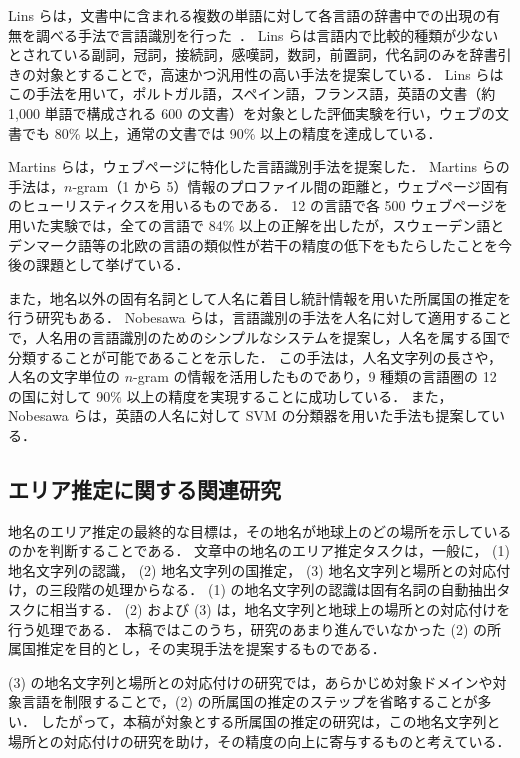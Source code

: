 \documentclass[japanese]{jnlp_1.4}
\begin{document}
Lins らは，文書中に含まれる複数の単語に対して各言語の辞書中での出現の有無を調べる手法で言語識別を行った~\cite{Lins04}．
Lins らは言語内で比較的種類が少ないとされている副詞，冠詞，接続詞，感嘆詞，数詞，前置詞，代名詞のみを辞書引きの対象とすることで，高速かつ汎用性の高い手法を提案している．
Lins らはこの手法を用いて，ポルトガル語，スペイン語，フランス語，英語の文書（約 1,000 単語で構成される 600 の文書）を対象とした評価実験を行い，ウェブの文書でも 80\% 以上，通常の文書では 90\% 以上の精度を達成している．

Martins らは，ウェブページに特化した言語識別手法を提案した\cite{Martins05}．
Martins らの手法は，$n$-gram（1 から 5）情報のプロファイル間の距離と，ウェブページ固有のヒューリスティクスを用いるものである．
12 の言語で各 500 ウェブページを用いた実験では，全ての言語で 84\% 以上の正解を出したが，スウェーデン語とデンマーク語等の北欧の言語の類似性が若干の精度の低下をもたらしたことを今後の課題として挙げている．

また，地名以外の固有名詞として人名に着目し統計情報を用いた所属国の推定を行う研究もある．
Nobesawa らは，言語識別の手法を人名に対して適用することで，人名用の言語識別のためのシンプルなシステムを提案し，人名を属する国で分類することが可能であることを示した\cite{nobesawa0512paclic}．
この手法は，人名文字列の長さや，人名の文字単位の $n$-gram の情報を活用したものであり，9 種類の言語圏の 12 の国に対して 90\% 以上の精度を実現することに成功している．
また，Nobesawa らは，英語の人名に対して SVM の分類器を用いた手法も提案している\cite{nobesawa0605ieee}．


\subsection{エリア推定に関する関連研究}
\label{sec:toponym-resolution}

地名のエリア推定の最終的な目標は，その地名が地球上のどの場所を示しているのかを判断することである．
文章中の地名のエリア推定タスクは，一般に， (1) 地名文字列の認識， (2) 地名文字列の国推定， (3) 地名文字列と場所との対応付け，の三段階の処理からなる．
(1) の地名文字列の認識は固有名詞の自動抽出タスクに相当する．
(2) および (3) は，地名文字列と地球上の場所との対応付けを行う処理である．
本稿ではこのうち，研究のあまり進んでいなかった (2) の所属国推定を目的とし，その実現手法を提案するものである．

(3) の地名文字列と場所との対応付けの研究では，あらかじめ対象ドメインや対象言語を制限することで，(2) の所属国の推定のステップを省略することが多い．
したがって，本稿が対象とする所属国の推定の研究は，この地名文字列と場所との対応付けの研究を助け，その精度の向上に寄与するものと考えている．
\end{document}
